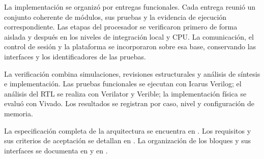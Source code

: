 La implementación se organizó por entregas funcionales. Cada entrega
reunió un conjunto coherente de módulos, sus pruebas y la evidencia
de ejecución correspondiente. Las etapas del procesador se
verificaron primero de forma aislada y después en los niveles de
integración local y CPU. La comunicación, el control de sesión y la
plataforma se incorporaron sobre esa base, conservando las interfaces
y los identificadores de las pruebas.

La verificación combina simulaciones, revisiones estructurales y
análisis de síntesis e implementación. Las pruebas funcionales se
ejecutan con Icarus Verilog; el análisis del RTL se realiza con
Verilator y Verible; la implementación física se evaluó con Vivado.
Los resultados se registran por caso, nivel y configuración de memoria.

La especificación completa de la arquitectura se encuentra en
.
Los requisitos y sus criterios de aceptación se detallan en
. La
organización de los bloques y sus interfaces se documenta en
 y en
.

